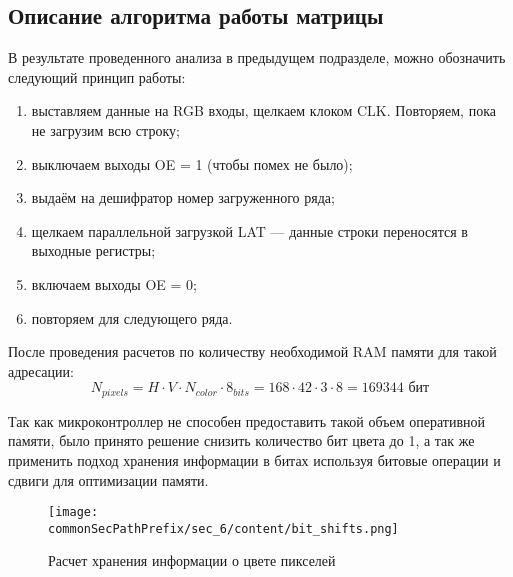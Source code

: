 \subsection{Описание алгоритма работы матрицы}
В результате проведенного анализа в предыдущем подразделе, можно обозначить следующий принцип работы:
\begin{enumerate}
    \item выставляем данные на RGB входы, щелкаем клоком CLK. Повторяем, пока не загрузим всю строку;
    \item выключаем выходы OE = 1 (чтобы помех не было);
    \item выдаём на дешифратор номер загруженного ряда;
    \item щелкаем параллельной загрузкой LAT — данные строки переносятся в выходные регистры;
    \item включаем выходы OE = 0;
    \item повторяем для следующего ряда.
\end{enumerate}

После проведения расчетов по количеству необходимой RAM памяти для такой адресации:
\[N_{pixels}=H \cdot V \cdot N_{color} \cdot 8_{bits} = 168 \cdot 42 \cdot 3 \cdot 8 = 169344\text{ бит}\]

Так как микроконтроллер не способен предоставить такой объем оперативной памяти, было принято решение снизить количество бит цвета до 1, а так же применить подход хранения информации в битах используя битовые операции и сдвиги для оптимизации памяти.

\begin{figure}[ht]
    \centering
    \texttt{[image: \\commonSecPathPrefix/sec\_6/content/bit\_shifts.png]}
    \caption{Расчет хранения информации о цвете пикселей}
\end{figure}
